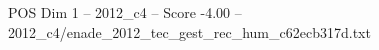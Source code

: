 \begin{textsample}{POS Dim 1 – 2012\_c4 – Score -4.00 – 2012\_c4/enade\_2012\_tec\_gest\_rec\_hum\_c62ecb317d.txt}
\end{textsample}
